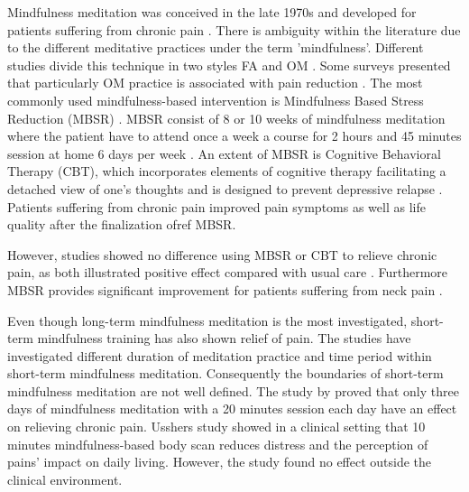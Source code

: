 Mindfulness meditation was conceived in the late 1970s and developed for patients suffering from chronic pain \cite{Chiesa2010}. There is ambiguity within the literature due to the different meditative practices under the term 'mindfulness'. Different studies divide this technique in two styles FA and OM \cite{Lutz2008, Zeidan2012}. Some surveys presented that particularly OM practice is associated with pain reduction \cite{Grant2009, Perlman2010}. The most commonly used mindfulness-based intervention is Mindfulness Based Stress Reduction (MBSR) \cite{Cramer2012}. MBSR consist of 8 or 10 weeks of mindfulness meditation where the patient have to attend once a week a course for 2 hours and 45 minutes session at home 6 days per week \cite{Kabat1982;Chiesa2010}. An extent of MBSR is Cognitive Behavioral Therapy (CBT), which incorporates elements of cognitive therapy facilitating a detached view of one's thoughts and is designed to prevent depressive relapse \cite{Chiesa2010}. Patients suffering from chronic pain improved pain symptoms as well as life quality after the finalization ofref MBSR. \cite{Zeidan2012} 

However, studies showed no difference using MBSR or CBT to relieve chronic pain, as both illustrated positive effect compared with usual care \cite{Jacob2016, Cherkin2016}. Furthermore MBSR provides significant improvement for patients suffering from neck pain \cite{Rosenzweig2010}.

Even though long-term mindfulness meditation is the most investigated, short-term mindfulness training has also shown relief of pain. The studies have investigated different duration of meditation practice and time period within short-term mindfulness meditation. Consequently the boundaries of short-term mindfulness meditation are not well defined. The study by \cite{Zeidan2012} proved that only three days of mindfulness meditation with a 20 minutes session each day have an effect on relieving chronic pain. Usshers study \cite{Ussher} showed in a clinical setting that 10 minutes mindfulness-based body scan reduces distress and the perception of pains’ impact on daily living. However, the study found no effect outside the clinical environment. \cite{Ussher2012} 
